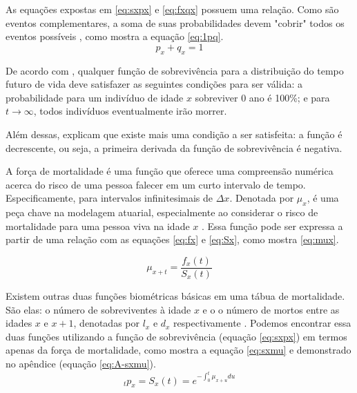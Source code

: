As equações expostas em \ref{eq:sxpx} e \ref{eq:fxqx} possuem uma relação. Como são eventos complementares, a soma de suas probabilidades devem "cobrir" \hspace{0.025cm} todos os eventos possíveis \cite{dickson2019}, como mostra a equação \ref{eq:1pq}.
\begin{equation}
    p_x+q_x=1
    \label{eq:1pq}
\end{equation}

De acordo com , qualquer função de sobrevivência para a distribuição do tempo futuro de vida deve satisfazer as seguintes condições para ser válida: a probabilidade para um indivíduo de idade $x$ sobreviver 0 ano é 100\%; e para $t \to \infty$, todos indivíduos eventualmente irão morrer.

Além dessas,  explicam que existe mais uma condição a ser satisfeita: a função é decrescente, ou seja, a primeira derivada da função de sobrevivência é negativa.

A força de mortalidade é uma função que oferece uma compreensão numérica acerca do risco de uma pessoa falecer em um curto intervalo de tempo. Especificamente, para intervalos infinitesimais de $\Delta x$. Denotada por $\mu_x$, é uma peça chave na modelagem atuarial, especialmente ao considerar o risco de mortalidade para uma pessoa viva na idade $x$ \cite{dickson2019, macdonald2018}. Essa função pode ser expressa a partir de uma relação com as equações \ref{eq:fx}  e \ref{eq:Sx}, como mostra \ref{eq:mux}.

\begin{equation}
    \mu_{x+t} = \frac{f_x(t)}{S_x(t)}
    \label{eq:mux}
\end{equation}

Existem outras duas funções biométricas básicas em uma tábua de mortalidade. São elas: o número de sobreviventes à idade $x$ e o o número de mortos entre as idades $x$ e $x+1$, denotadas por $l_x$ e $d_x$ respectivamente \cite{bowers2006}. Podemos encontrar essa duas funções utilizando a função de sobrevivência (equação \ref{eq:sxpx}) em termos apenas da força de mortalidade, como mostra  a equação \ref{eq:sxmu} e demonstrado no apêndice (equação \ref{eq:A-sxmu}).
\begin{equation}
    {}_tp_x=S_x(t)=e^{-\int_0^t\mu_{x+u}du} 
    \label{eq:sxmu}
\end{equation}


